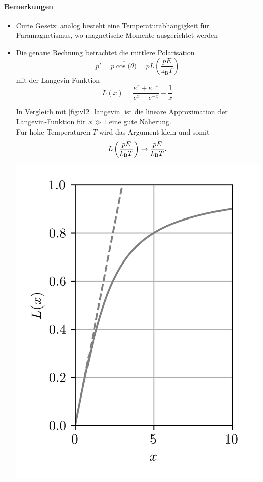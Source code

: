\paragraph{Bemerkungen}
    \begin{itemize}
    	\item Curie Gesetz: analog besteht eine Temperaturabhängigkeit für Paramagnetismus, wo magnetische Momente ausgerichtet werden
    	\item Die genaue Rechnung betrachtet die mittlere Polarisation
    		$$
    		p' = p \overline{\cos( \theta}) = p L \left( \frac{p E}{ \mathrm{k} _{\mathrm{B}}T} \right) 
    		$$ 
    		mit der Langevin-Funktion
    		$$
    		L\left( x \right) = \frac{e^{x} + e^{-x}}{ e^{x} - e^{-x}}  - \frac{1}{x}
    		$$
            \begin{verbal_sidebyside}[7cm]
                In Vergleich mit \autoref{fig:vl2_langevin} ist die lineare Approximation der
                Langevin-Funktion für $x\gg1$ eine gute Näherung.\\
                
                Für hohe Temperaturen $T$ wird das Argument klein und somit
                $$L\left(\frac{pE}{k_\text BT}\right) \to \frac{pE}{k_\text BT}.$$
                
                \tcblower
                \centering
                \includegraphics[width=\linewidth]{figures/vl2_langevin.jpg}
                \label{fig:vl2_langevin}
            \end{verbal_sidebyside}
        

\end{itemize}
